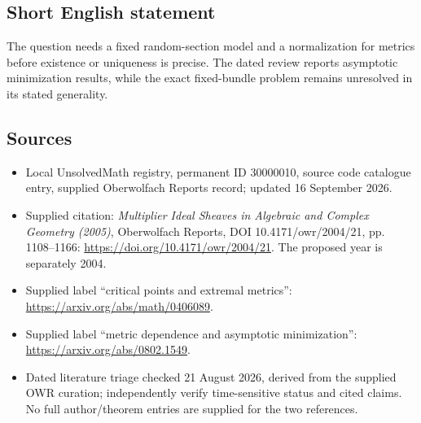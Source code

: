 \documentclass[11pt]{article}
\begin{document}
\subsection{Short English statement}
The question needs a fixed random-section model and a normalization for metrics before existence or uniqueness is precise. The dated review reports asymptotic minimization results, while the exact fixed-bundle problem remains unresolved in its stated generality.
\subsection{Sources}
\begin{itemize}
\item Local UnsolvedMath registry, permanent ID 30000010, source code catalogue entry, supplied Oberwolfach Reports record; updated 16 September 2026.
\item Supplied citation: \emph{Multiplier Ideal Sheaves in Algebraic and Complex Geometry (2005)}, Oberwolfach Reports, DOI 10.4171/owr/2004/21, pp. 1108--1166: \url{https://doi.org/10.4171/owr/2004/21}. The proposed year is separately 2004.
\item Supplied label ``critical points and extremal metrics'': \url{https://arxiv.org/abs/math/0406089}.
\item Supplied label ``metric dependence and asymptotic minimization'': \url{https://arxiv.org/abs/0802.1549}.
\item Dated literature triage checked 21 August 2026, derived from the supplied OWR curation; independently verify time-sensitive status and cited claims. No full author/theorem entries are supplied for the two references.
\end{itemize}
\end{document}

